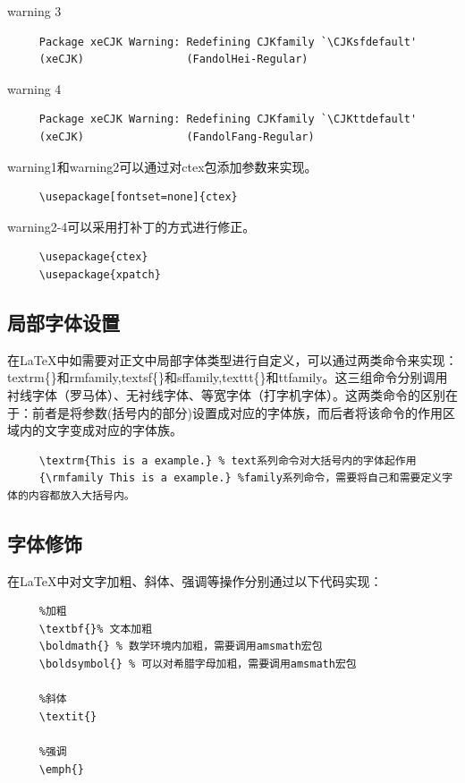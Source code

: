 \documentclass[12pt]{book}
\begin{document}
warning 3
\begin{verbatim}
     Package xeCJK Warning: Redefining CJKfamily `\CJKsfdefault'
     (xeCJK)                (FandolHei-Regular)
\end{verbatim}

warning 4
\begin{verbatim}
     Package xeCJK Warning: Redefining CJKfamily `\CJKttdefault'
     (xeCJK)                (FandolFang-Regular)
\end{verbatim}

warning1和warning2可以通过对ctex包添加参数来实现。
\begin{verbatim}
     \usepackage[fontset=none]{ctex}
\end{verbatim}

warning2-4可以采用打补丁的方式进行修正。
\begin{verbatim}
     \usepackage{ctex}
     \usepackage{xpatch}
\end{verbatim}

\subsection{局部字体设置}

在\LaTeX{}中如需要对正文中局部字体类型进行自定义，可以通过两类命令来实现：textrm\{\}和rmfamily,textsf\{\}和sffamily,texttt\{\}和ttfamily。这三组命令分别调用衬线字体（罗马体）、无衬线字体、等宽字体（打字机字体）。这两类命令的区别在于：前者是将参数(括号内的部分)设置成对应的字体族，而后者将该命令的作用区域内的文字变成对应的字体族。

\begin{verbatim}
     \textrm{This is a example.} % text系列命令对大括号内的字体起作用
     {\rmfamily This is a example.} %family系列命令，需要将自己和需要定义字体的内容都放入大括号内。
\end{verbatim}

\subsection{字体修饰}


在\LaTeX{}中对文字加粗、斜体、强调等操作分别通过以下代码实现：

\begin{verbatim}
     %加粗
     \textbf{}% 文本加粗
     \boldmath{} % 数学环境内加粗，需要调用amsmath宏包
     \boldsymbol{} % 可以对希腊字母加粗，需要调用amsmath宏包
     
     %斜体
     \textit{}
     
     %强调
     \emph{}
\end{verbatim}
\end{document}
